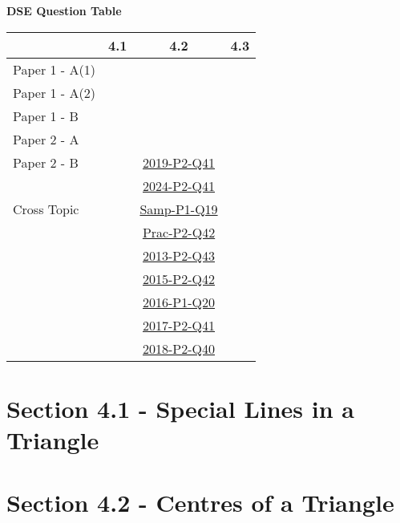 \documentclass[12pt, a4paper]{article}
\begin{document}
\begin{absolutelynopagebreak}
\begin{center}
\textbf{DSE Question Table}
\end{center}
\begin{center}
\begin{tabular}{|l|c|c|c|}
\hline
        & 4.1 & 4.2 & 4.3 \\\hline
\hline
Paper 1 - A(1)&  &  &  \\
\hline
Paper 1 - A(2)&  &  &  \\
\hline
Paper 1 - B&  &  &  \\
\hline
\hline
Paper 2 - A&  &  &  \\
\hline
Paper 2 - B&  & \hyperref[DSE2019-CoreP2-Q41]{2019-P2-Q41} &  \\
&  & \hyperref[DSE2024-CoreP2-Q41]{2024-P2-Q41} &  \\
\hline
\hline
Cross Topic&  & \hyperref[DSE2012S-CoreP1-Q19]{Samp-P1-Q19} &  \\
&  & \hyperref[DSE2012P-CoreP2-Q42]{Prac-P2-Q42} &  \\
&  & \hyperref[DSE2013-CoreP2-Q43]{2013-P2-Q43} &  \\
&  & \hyperref[DSE2015-CoreP2-Q42]{2015-P2-Q42} &  \\
&  & \hyperref[DSE2016-CoreP1-Q20]{2016-P1-Q20} &  \\
&  & \hyperref[DSE2017-CoreP2-Q41]{2017-P2-Q41} &  \\
&  & \hyperref[DSE2018-CoreP2-Q40]{2018-P2-Q40} &  \\
\hline
\end{tabular}
\end{center}
\end{absolutelynopagebreak}




\section*{Section 4.1 - Special Lines in a Triangle}\label{section:3-4-1}





\section*{Section 4.2 - Centres of a Triangle \NF}\label{section:3-4-2}
\end{document}
